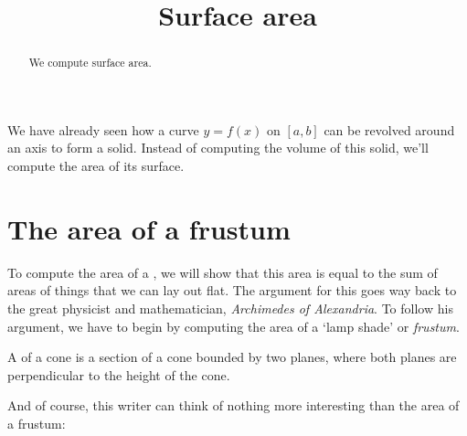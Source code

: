 \documentclass{ximera}
\title[Dig-In:]{Surface area}
\begin{document}
\begin{abstract}
We compute surface area.
\end{abstract}
\maketitle


We have already seen how a curve $y=f(x)$ on $[a,b]$ can be revolved
around an axis to form a solid. Instead of computing the volume of
this solid, we'll compute the area of its surface.

\section{The area of a frustum}

To compute the area of a , we will show
that this area is equal to the sum of areas of things that we can
lay out flat. The argument for this goes way back to the great
physicist and mathematician, \textit{Archimedes of Alexandria}. To follow his
argument, we have to begin by computing the area of a `lamp shade' or
\textit{frustum}.

\begin{definition}
  A  of a cone is a section of a cone bounded by two
  planes, where both planes are perpendicular to the height of the
  cone.
  \begin{image}
  \end{image}
\end{definition}

And of course, this writer can think of nothing more interesting than
the area of a frustum:
\end{document}
